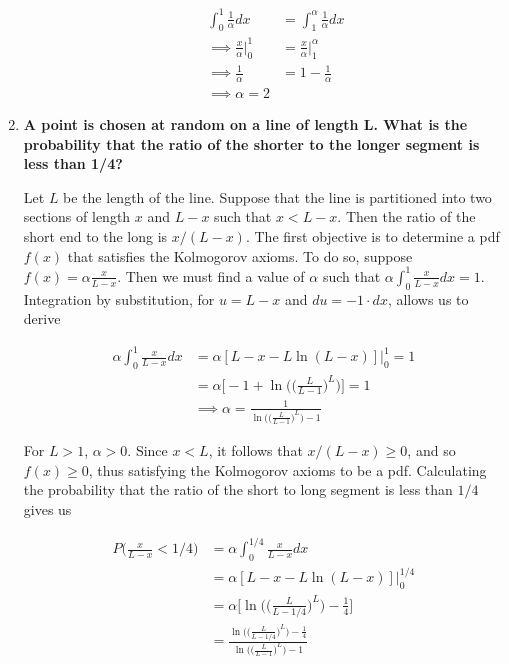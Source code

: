 \documentclass[10pt, oneside]{article}   	%
\theoremstyle{definition}
\begin{document}
\begin{enumerate}[label=4.\arabic*]
\begin{enumerate}
	\begin{align*}
	\int^1_0 \frac{1}{\alpha} dx &= \int^\alpha_1 \frac{1}{\alpha}dx \\
	\implies \frac{x}{\alpha} \Big|^1_0 &= \frac{x}{\alpha} \Big|^\alpha_1 \\
	\implies \frac{1}{\alpha} &= 1 - \frac{1}{\alpha} \\
	\implies \boxed{\alpha = 2}
	\end{align*}
	\end{enumerate}

\item  \begin{tcolorbox}[
  colback=Cerulean!5!white,
  colframe=Cerulean!75!black]
\textbf{A point is chosen at random on a line of length $\bm{L}$. What is the probability that the ratio of the shorter to the longer segment is less than 1/4?}
\end{tcolorbox}

Let $L$ be the length of the line. Suppose that the line is partitioned into two sections of length $x$ and $L-x$ such that $x < L-x$. Then the ratio of the short end to the long is $x / (L-x)$. The first objective is to determine a pdf $f(x)$ that satisfies the Kolmogorov axioms. To do so, suppose $f(x) = \alpha \frac{x}{L-x}$. Then we must find a value of $\alpha$ such that $\alpha \int^1_0 \frac{x}{L-x}dx = 1$. Integration by substitution, for $u = L-x$ and $du = -1 \cdot dx$, allows us to derive

\begin{align*}
\alpha \int^1_0 \frac{x}{L-x}dx &= \alpha [L - x - L \ln (L-x)] \Big|^1_0 = 1 \\
&= \alpha \Bigg[ -1 + \ln \Bigg( \Bigg( \frac{L}{L-1} \Bigg)^L \Bigg) \Bigg] = 1 \\
&\implies \boxed{\alpha = \frac{1}{\ln \Big( \Big( \frac{L}{L-1} \Big)^L \Big) - 1}}
\end{align*}

For $L > 1$, $\alpha > 0$. Since $x < L$, it follows that $x / (L-x) \geq 0$, and so $f(x) \geq 0$, thus satisfying the Kolmogorov axioms to be a pdf. Calculating the probability that the ratio of the short to long segment is less than $1/4$ gives us

\begin{align*}
P\Big( \frac{x}{L-x} < 1/4 \Big) &= \alpha \int^{1/4}_0 \frac{x}{L-x} dx \\
&= \alpha [L-x-L \ln (L-x)] \Big|^{1/4}_0 \\
&= \alpha \Big[ \ln \Big( \Big( \frac{L}{L - 1/4} \Big)^L \Big) - \frac{1}{4} \Big] \\
&= \boxed{ \frac{ \ln \Big( \Big( \frac{L}{L - 1/4} \Big)^L \Big) - \frac{1}{4} }{ \ln \Big( \Big( \frac{L}{L-1} \Big)^L \Big) - 1 } }
\end{align*}


\end{enumerate}
\end{document}
